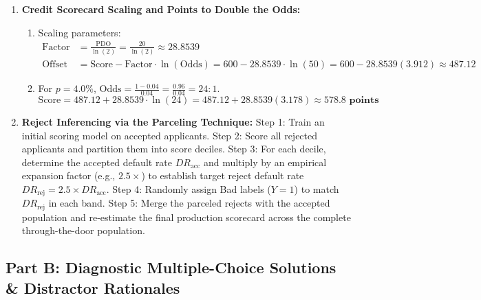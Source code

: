 \begin{enumerate}[label=\textbf{P8.\arabic*}]
    \item \textbf{Credit Scorecard Scaling and Points to Double the Odds:}
    \begin{enumerate}[label=(\alph*)]
        \item Scaling parameters:
        \begin{align*}
        \text{Factor} &= \frac{\text{PDO}}{\ln(2)} = \frac{20}{\ln(2)} \approx \mathbf{28.8539} \\
        \text{Offset} &= \text{Score} - \text{Factor} \cdot \ln(\text{Odds}) = 600 - 28.8539 \cdot \ln(50) = 600 - 28.8539(3.912) \approx \mathbf{487.12}
        \end{align*}
        \item For $p = 4.0\%$, $\text{Odds} = \frac{1 - 0.04}{0.04} = \frac{0.96}{0.04} = 24:1$.
        \begin{equation*}
        \text{Score} = 487.12 + 28.8539 \cdot \ln(24) = 487.12 + 28.8539(3.178) \approx \mathbf{578.8\text{ points}}
        \end{equation*}
    \end{enumerate}

    \item \textbf{Reject Inferencing via the Parceling Technique:}
    Step 1: Train an initial scoring model on accepted applicants.
    Step 2: Score all rejected applicants and partition them into score deciles.
    Step 3: For each decile, determine the accepted default rate $DR_{\text{acc}}$ and multiply by an empirical expansion factor (e.g., $2.5\times$) to establish target reject default rate $DR_{\text{rej}} = 2.5 \times DR_{\text{acc}}$.
    Step 4: Randomly assign Bad labels ($Y=1$) to match $DR_{\text{rej}}$ in each band.
    Step 5: Merge the parceled rejects with the accepted population and re-estimate the final production scorecard across the complete through-the-door population.
\end{enumerate}

\subsection*{Part B: Diagnostic Multiple-Choice Solutions \& Distractor Rationales}

